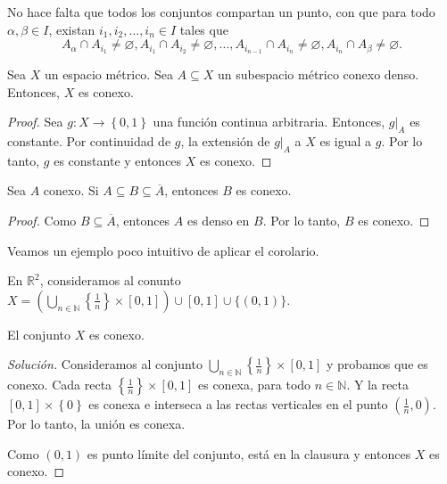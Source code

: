 \begin{remark}
	No hace falta que todos los conjuntos compartan un punto, con que para todo $\alpha, \beta \in I$, existan $i_1, i_2, \ldots, i_n \in I$ tales que
	\begin{equation*}
		A_{\alpha} \cap A_{i_1} \neq \varnothing, A_{i_1} \cap A_{i_2} \neq \varnothing, \ldots, A_{i_{n-1}} \cap A_{i_n} \neq \varnothing, A_{i_n} \cap A_{\beta} \neq \varnothing.
	\end{equation*}

	\begin{center}
		
	\end{center}
\end{remark}

\begin{proposition}
	Sea $X$ un espacio métrico. Sea $A \subseteq X$ un subespacio métrico conexo denso. Entonces, $X$ es conexo.
\end{proposition}

\begin{proof}
	Sea $g : X \to \left\{ 0, 1 \right\}$ una función continua arbitraria. Entonces, $g|_A$ es constante. Por continuidad de $g$, la extensión de $g|_A$ a $X$ es igual a $g$. Por lo tanto, $g$ es constante y entonces $X$ es conexo.
\end{proof}

\begin{corollary}
	Sea $A$ conexo. Si $A \subseteq B \subseteq \overline{A}$, entonces $B$ es conexo.
\end{corollary}

\begin{proof}
	Como $B \subseteq \overline{A}$, entonces $A$ es denso en $B$. Por lo tanto, $B$ es conexo.
\end{proof}

Veamos un ejemplo poco intuitivo de aplicar el corolario.

\begin{example}
	En $\mathbb{R}^{2}$, consideramos al conunto $X = (\bigcup_{n \in \mathbb{N}} \left\{ \frac{1}{n} \right\} \times [0, 1]) \cup [0, 1] \cup \{(0, 1)\}$.

	\begin{center}
		
	\end{center}

	El conjunto $X$ es conexo.
\end{example}

\begin{proof}[Solución]
	Consideramos al conjunto $\bigcup_{n \in \mathbb{N}} \left\{ \frac{1}{n} \right\} \times [0, 1]$ y probamos que es conexo. Cada recta $\left\{ \frac{1}{n} \right\} \times [0, 1]$ es conexa, para todo $n \in \mathbb{N}$. Y la recta $[0, 1] \times \left\{ 0 \right\}$ es conexa e interseca a las rectas verticales en el punto $(\frac{1}{n}, 0)$. Por lo tanto, la unión es conexa.

	Como $(0, 1)$ es punto límite del conjunto, está en la clausura y entonces $X$ es conexo.
\end{proof}

